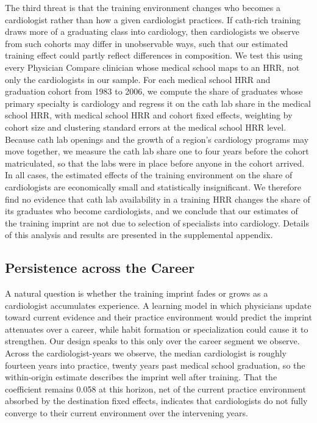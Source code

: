 \documentclass[12pt]{article}
\begin{document}
The third threat is that the training environment changes who becomes a cardiologist rather than how a given cardiologist practices. If cath-rich training draws more of a graduating class into cardiology, then cardiologists we observe from such cohorts may differ in unobservable ways, such that our estimated training effect could partly reflect differences in composition. We test this using every Physician Compare clinician whose medical school maps to an HRR, not only the cardiologists in our sample. For each medical school HRR and graduation cohort from 1983 to 2006, we compute the share of graduates whose primary specialty is cardiology and regress it on the cath lab share in the medical school HRR, with medical school HRR and cohort fixed effects, weighting by cohort size and clustering standard errors at the medical school HRR level. Because cath lab openings and the growth of a region's cardiology programs may move together, we measure the cath lab share one to four years before the cohort matriculated, so that the labs were in place before anyone in the cohort arrived. In all cases, the estimated effects of the training environment on the share of cardiologists are economically small and statistically insignificant. We therefore find no evidence that cath lab availability in a training HRR changes the share of its graduates who become cardiologists, and we conclude that our estimates of the training imprint are not due to selection of specialists into cardiology. Details of this analysis and results are presented in the supplemental appendix.

\subsection{Persistence across the Career}\label{sec:imprint-persistence}

A natural question is whether the training imprint fades or grows as a cardiologist accumulates experience. A learning model in which physicians update toward current evidence and their practice environment would predict the imprint attenuates over a career, while habit formation or specialization could cause it to strengthen. Our design speaks to this only over the career segment we observe. Across the cardiologist-years we observe, the median cardiologist is roughly fourteen years into practice, twenty years past medical school graduation, so the within-origin estimate describes the imprint well after training. That the coefficient remains 0.058 at this horizon, net of the current practice environment absorbed by the destination fixed effects, indicates that cardiologists do not fully converge to their current environment over the intervening years.
\end{document}
